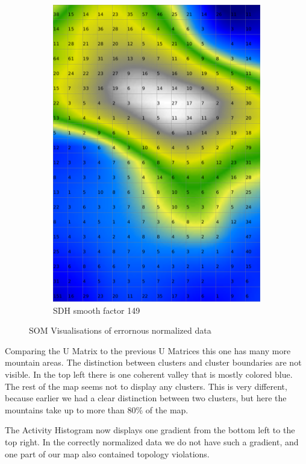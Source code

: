\documentclass{acm_proc_article-sp}
\begin{document}
\begin{figure}
\begin{subfigure}[b]{0.45\linewidth}
        \includegraphics[width=\linewidth]{img/wine-weird-smoothed-data-histogram}
        \caption{SDH smooth factor 149}
        \label{fig:wine-weird-smoothed-data-histogram}
    \end{subfigure}
    \caption{SOM Visualisations of errornous normalized data}
\end{figure}

Comparing the U Matrix to the previous U Matrices this one has many more mountain
areas. The distinction between clusters and cluster boundaries are not visible.
In the top left there is one coherent valley that is mostly colored blue.
The rest of the map seems not to display any clusters. This is very different, because
earlier we had a clear distinction between two clusters, but here the mountains
take up to more than 80\% of the map.

The Activity Histogram now displays one gradient from the bottom left to the top right.
In the correctly normalized data we do not have such a gradient, and one part of our map
also contained topology violations.
\end{document}

